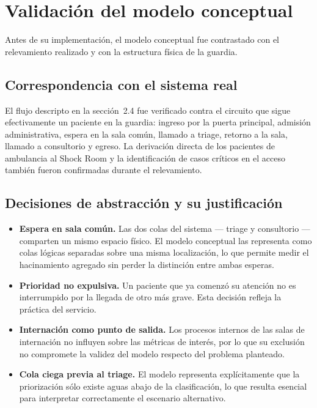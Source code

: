 \section{Validación del modelo conceptual}

Antes de su implementación, el modelo conceptual fue contrastado con el
relevamiento realizado y con la estructura física de la guardia.

\subsection{Correspondencia con el sistema real}

El flujo descripto en la sección~2.4 fue verificado contra el circuito que
sigue efectivamente un paciente en la guardia: ingreso por la puerta
principal, admisión administrativa, espera en la sala común, llamado a
triage, retorno a la sala, llamado a consultorio y egreso. La derivación
directa de los pacientes de ambulancia al Shock Room y la identificación de
casos críticos en el acceso también fueron confirmadas durante el
relevamiento.

\subsection{Decisiones de abstracción y su justificación}

\begin{itemize}
  \item \textbf{Espera en sala común.} Las dos colas del sistema --- triage y
  consultorio --- comparten un mismo espacio físico. El modelo conceptual las
  representa como colas lógicas separadas sobre una misma localización, lo
  que permite medir el hacinamiento agregado sin perder la distinción entre
  ambas esperas.
  \item \textbf{Prioridad no expulsiva.} Un paciente que ya comenzó su
  atención no es interrumpido por la llegada de otro más grave. Esta decisión
  refleja la práctica del servicio.
  \item \textbf{Internación como punto de salida.} Los procesos internos de
  las salas de internación no influyen sobre las métricas de interés, por lo
  que su exclusión no compromete la validez del modelo respecto del problema
  planteado.
  \item \textbf{Cola ciega previa al triage.} El modelo representa
  explícitamente que la priorización sólo existe aguas abajo de la
  clasificación, lo que resulta esencial para interpretar correctamente el
  escenario alternativo.
\end{itemize}

